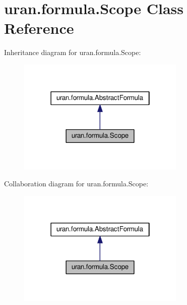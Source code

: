 \hypertarget{classuran_1_1formula_1_1_scope}{}\section{uran.\+formula.\+Scope Class Reference}
\label{classuran_1_1formula_1_1_scope}


Inheritance diagram for uran.\+formula.\+Scope\+:
\nopagebreak
\begin{figure}[H]
\begin{center}
\leavevmode
\includegraphics[width=226pt]{classuran_1_1formula_1_1_scope__inherit__graph}
\end{center}
\end{figure}


Collaboration diagram for uran.\+formula.\+Scope\+:
\nopagebreak
\begin{figure}[H]
\begin{center}
\leavevmode
\includegraphics[width=226pt]{classuran_1_1formula_1_1_scope__coll__graph}
\end{center}
\end{figure}
